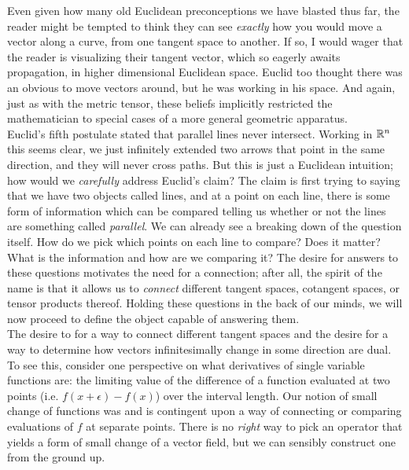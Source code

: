  Even given how many old Euclidean preconceptions we have blasted thus far, the reader might be tempted to think they can see \textit{exactly} how you would move a vector along a curve, from one tangent space to another.  If so, I would wager that the reader is visualizing their tangent vector, which so eagerly awaits propagation, in higher dimensional Euclidean space.  Euclid too thought there was an obvious to move vectors around, but he was working in his space.  And again, just as with the metric tensor, these beliefs implicitly restricted the mathematician to special cases of a more general geometric apparatus.\\
 
 Euclid's fifth postulate stated that parallel lines never intersect.  Working in $\mathbb{R}^n$ this seems clear, we just infinitely extended two arrows that point in the same direction, and they will never cross paths.  But this is just a Euclidean intuition; how would we \textit{carefully} address Euclid's claim? The claim is first trying to saying that we have two objects called lines, and at a point on each line, there is some form of information which can be compared telling us whether or not the lines are something called \textit{parallel}.  We can already see a breaking down of the question itself.  How do we pick which points on each line to compare?  Does it matter?  What is the information and how are we comparing it?  The desire for answers to these questions motivates the need for a connection; after all, the spirit of the name is that it allows us to \textit{connect} different tangent spaces, cotangent spaces, or tensor products thereof.  Holding these questions in the back of our minds, we will now proceed to define the object capable of answering them.\\
 
The desire to for a way to connect different tangent spaces and the desire for a way to determine how vectors infinitesimally change in some direction are dual.  To see this, consider one perspective on what derivatives of single variable functions are: the limiting value of the difference of a function evaluated at two points (i.e. $f(x+\epsilon)-f(x)$) over the interval length.  Our notion of small change of functions was and is contingent upon a way of connecting or comparing evaluations of $f$ at separate points.  There is no \textit{right} way to pick an operator that yields a form of small change of a vector field, but we can sensibly construct one from the ground up.\\

